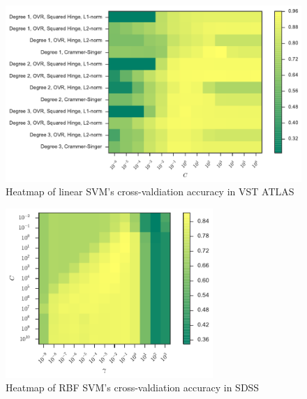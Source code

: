\begin{figure}[p]
	\centering
	\includegraphics[width=\textwidth]{figures/4_expt1/vstatlas_grid_poly}
	\caption[Heatmap of linear SVM's cross-valdiation accuracy in VST ATLAS]{
		Heatmap of linear SVM's cross-valdiation accuracy in VST ATLAS}
	\label{fig:vstatlas_grid_poly}
\end{figure}

\begin{figure}[p]
	\centering
	\includegraphics[width=0.7\textwidth]{figures/4_expt1/sdss_grid_rbf}
	\caption[Heatmap of RBF SVM's cross-valdiation accuracy in SDSS]{
		Heatmap of RBF SVM's cross-valdiation accuracy in SDSS}
	\label{fig:sdss_grid_rbf}
\end{figure}

